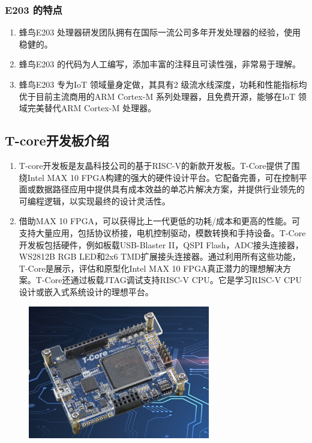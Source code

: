 \documentclass[a4paper, 14pt, oneside]{book} %
\numberwithin{equation}{subsection}
\begin{document}
			\subsubsection{E203 的特点}
				\begin{enumerate}
					\item 
						蜂鸟E203 处理器研发团队拥有在国际一流公司多年开发处理器的经验，使用稳健的。
					\item 
						蜂鸟E203 的代码为人工编写，添加丰富的注释且可读性强，非常易于理解。
					\item 
						蜂鸟E203 专为IoT 领域量身定做，其具有2 级流水线深度，功耗和性能指标均优于目前主流商用的ARM Cortex-M 系列处理器，且免费开源，能够在IoT 领域完美替代ARM Cortex-M 处理器。
				\end{enumerate}	

		\subsection{T-core开发板介绍}
			\begin{enumerate}
				\item 
					T-core开发板是友晶科技公司的基于RISC-V的新款开发板。T-Core提供了围绕Intel MAX 10 FPGA构建的强大的硬件设计平台。它配备完善，可在控制平面或数据路径应用中提供具有成本效益的单芯片解决方案，并提供行业领先的可编程逻辑，以实现最终的设计灵活性。
				\item 
					借助MAX 10 FPGA，可以获得比上一代更低的功耗/成本和更高的性能。可支持大量应用，包括协议桥接，电机控制驱动，模数转换和手持设备。T-Core开发板包括硬件，例如板载USB-Blaster II，QSPI Flash，ADC接头连接器，WS2812B RGB LED和2x6 TMD扩展接头连接器。通过利用所有这些功能，T-Core是展示，评估和原型化Intel MAX 10 FPGA真正潜力的理想解决方案。T-Core还通过板载JTAG调试支持RISC-V CPU。它是学习RISC-V CPU设计或嵌入式系统设计的理想平台。
			\end{enumerate}	
			\begin{figure}[!htbp]
				\centering
				\includegraphics[scale=1]{img/five.png}
			\end{figure}
\end{document}
